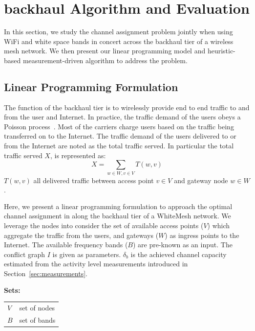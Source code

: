 \section{backhaul Algorithm and Evaluation}
\label{sec:whitemesh}

In this section, we study the channel assignment problem jointly when using WiFi and white space 
bands in concert across the backhaul tier of a wireless mesh network. We then present our linear programming model and 
heuristic-based measurement-driven algorithm to address the problem. 
 
\subsection{Linear Programming Formulation}
\label{subsec:linearopt}

The function of the backhaul tier is to wirelessly provide end to end traffic to and from the user and Internet.
In practice, the traffic demand of the users obeys a Poisson process~\cite{saaty1961elements}. 
Most of the carriers charge users based on the traffic being transferred on to the Internet. 
The traffic demand of the users delivered to or from the Internet are noted as the total traffic served. 
In particular the total traffic served $X$, is represented as:
\begin{equation}
\label{eq:goodput}
X=\sum_{w \in W, v \in V}T(w,v)
\end{equation}
$T(w,v)$ all delivered traffic between access point $v \in V$ and gateway node $w \in W$.

Here, we present a linear programming formulation to approach the optimal channel assignment in along the backhaul 
tier of a WhiteMesh network. 
We leverage the nodes into consider the set of available access points ($V$) which aggregate the traffic from the users, 
and gateways ($W$) as ingress points to the Internet. The available frequency bands ($B$) are pre-known 
as an input. The conflict graph $I$ is given as parameters. 
$\delta_b$ is the achieved channel capacity estimated from the  activity level measurements 
introduced in Section~\ref{sec:measurements}.


\noindent
{\bf Sets:}
\begin{tabular}{ll}
$V$ & set of nodes \\
$B$ & set of bands \\
\end{tabular}

